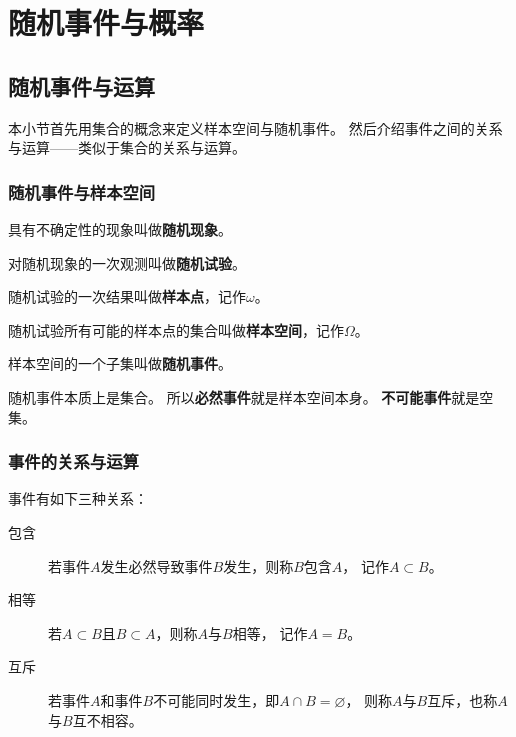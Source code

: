 \chapter{随机事件与概率}

\section{随机事件与运算}
本小节首先用集合的概念来定义样本空间与随机事件。
然后介绍事件之间的关系与运算——类似于集合的关系与运算。

\subsection{随机事件与样本空间}
\begin{definition}[随机现象]
  具有不确定性的现象叫做\textbf{随机现象}。
\end{definition}

\begin{definition}[随机试验]
  对随机现象的一次观测叫做\textbf{随机试验}。
\end{definition}

\begin{definition}[样本点]
  随机试验的一次结果叫做\textbf{样本点}，记作$\omega$。
\end{definition}

\begin{definition}[样本空间]
  随机试验所有可能的样本点的集合叫做\textbf{样本空间}，记作$\Omega$。
\end{definition}

\begin{definition}[随机事件]
  样本空间的一个子集叫做\textbf{随机事件}。
\end{definition}

\begin{remark}
  随机事件本质上是集合。
  所以\textbf{必然事件}就是样本空间本身。
  \textbf{不可能事件}就是空集。
\end{remark}

\subsection{事件的关系与运算}

\begin{definition}[事件的关系]
  事件有如下三种关系：
  \begin{description}
    \item[包含]
    若事件$A$发生必然导致事件$B$发生，则称$B$包含$A$，
    记作$A\subset B$。
    \item[相等]
    若$A\subset B$且$B\subset A$，则称$A$与$B$相等，
    记作$A=B$。
    \item[互斥]
    若事件$A$和事件$B$不可能同时发生，即$A\cap B=\varnothing$，
    则称$A$与$B$互斥，也称$A$与$B$互不相容。
  \end{description}
\end{definition}


